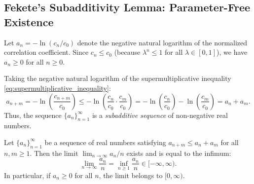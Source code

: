 \subsection{Fekete's Subadditivity Lemma: Parameter-Free Existence}
\label{subsec:fekete_parameter_free}

Let $a_n = -\ln(c_n / c_0)$ denote the negative natural logarithm of the normalized correlation coefficient. Since $c_n \le c_0$ (because $\lambda^n \le 1$ for all $\lambda \in [0, 1]$), we have $a_n \ge 0$ for all $n \ge 0$.

Taking the negative natural logarithm of the supermultiplicative inequality \eqref{eq:supermultiplicative_inequality}:
\begin{equation}
\label{eq:subadditive_sequence_a}
a_{n+m} = -\ln\left(\frac{c_{n+m}}{c_0}\right) \le -\ln\left(\frac{c_n}{c_0} \cdot \frac{c_m}{c_0}\right) = -\ln\left(\frac{c_n}{c_0}\right) - \ln\left(\frac{c_m}{c_0}\right) = a_n + a_m.
\end{equation}
Thus, the sequence $\{a_n\}_{n=1}^\infty$ is a \emph{subadditive sequence} of non-negative real numbers.

\begin{theorem}
\label{thm:fekete_lemma_ch8}
Let $\{a_n\}_{n=1}^\infty$ be a sequence of real numbers satisfying $a_{n+m} \le a_n + a_m$ for all $n, m \ge 1$. Then the limit $\lim_{n \to \infty} a_n/n$ exists and is equal to the infimum:
\begin{equation}
\label{eq:fekete_limit_identity}
\lim_{n \to \infty} \frac{a_n}{n} = \inf_{n \ge 1} \frac{a_n}{n} \in [-\infty, \infty).
\end{equation}
In particular, if $a_n \ge 0$ for all $n$, the limit belongs to $[0, \infty)$.
\end{theorem}

